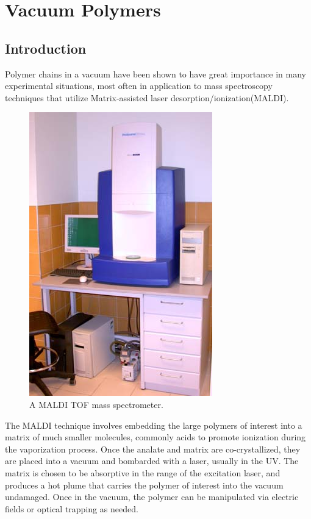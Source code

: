 \documentclass[11pt]{ucthesis}
\begin{document}
\part{Vacuum Polymers}
\chapter{Introduction}

Polymer chains in a vacuum have been shown to have great importance
in many experimental situations, most often in application to mass
spectroscopy techniques that utilize Matrix-assisted laser desorption/ionization(MALDI). 
\begin{figure}
\begin{center}
\includegraphics[width=0.6\hsize]{maldi}
\caption{A MALDI TOF mass spectrometer.}
\label{fig:rgplot}
\end{center}
\end{figure}
The MALDI technique involves embedding the large polymers of interest into a matrix of much smaller molecules, commonly acids to promote ionization during the vaporization process. 
Once the analate and matrix are co-crystallized, they are placed into a vacuum and bombarded with a laser, usually in the UV. 
The matrix is chosen to be absorptive in the range of the excitation laser, and produces a hot plume that carries the polymer of interest into the vacuum undamaged.
Once in the vacuum, the polymer can be manipulated via electric fields or optical trapping as needed.
\end{document}
